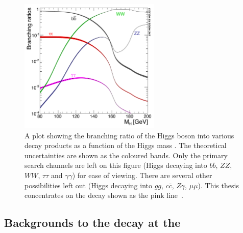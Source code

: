 \begin{figure}
  \includegraphics[width=0.6\textwidth]{theory/plots/Higgs_BR_LM}
  \caption[\acs{SM} Higgs branching fraction]{A plot showing the branching ratio of the \SM Higgs boson into various decay products as a function of the Higgs mass \mH. The theoretical uncertainties are shown as the coloured bands. Only the primary search channels are left on this figure (Higgs decaying into $b\bar{b}$, $ZZ$, $WW$, $\tau\tau$ and $\gamma\gamma$) for ease of viewing. There are several other possibilities left out (Higgs decaying into $gg$, $c\bar{c}$, $Z\gamma$, $\mu\mu$). This thesis concentrates on the \Hgg decay shown as the pink line~\cite{LHCHiggsCrossSectionWorkingGroup3}.}
  \label{fig:higgs_br}
\end{figure}

\subsection{Backgrounds to the \Hgg decay at the \LHC}

